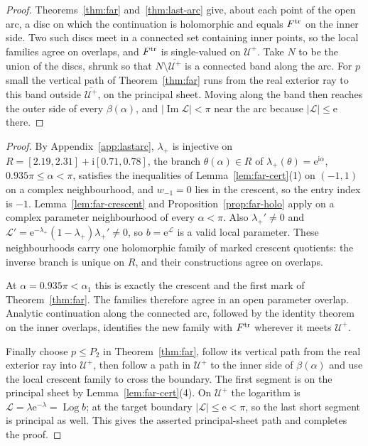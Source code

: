 \documentclass[11pt]{amsart}
\theoremstyle{definition}
\newcommand{\eee}{\mathrm{e}}
\newcommand{\ii}{\mathrm{i}}
\begin{document}
\begin{proof}
Theorems~\ref{thm:far} and~\ref{thm:last-arc} give, about each point of the open
arc, a disc on which the continuation is holomorphic and equals $F^{\rm tr}$ on the
inner side.  Two such discs meet in a connected set containing inner points, so
the local families agree on overlaps, and $F^{\rm tr}$ is single-valued on $\mathcal U^+$.
Take $N$ to be the union of the discs, shrunk so that $N\setminus\overline{\mathcal U^+}$ is a connected
band along the arc.  For $p$ small the vertical path of Theorem~\ref{thm:far}
runs from the real exterior ray to this band outside $\overline{\mathcal U^+}$, on the principal
sheet.  Moving along the band then reaches the outer side of every $\beta(\alpha)$,
and $|\operatorname{Im}\mathcal L|<\pi$ near the arc because $|\mathcal L|\le\eee$ there.
\end{proof}

\begin{proof}
By Appendix~\ref{app:lastarc}, $\lambda_+$ is injective on $R=[2.19,2.31]+\ii[0.71,0.78]$, the
branch $\theta(\alpha)\in R$ of $\lambda_+(\theta)=\eee^{\ii\alpha}$, $0.935\pi\le\alpha<\pi$, satisfies the inequalities of
Lemma~\ref{lem:far-cert}(1) on $(-1,1)$ on a complex neighbourhood, and $w_{-1}=0$ lies in the
crescent, so the entry index is $-1$.  Lemma~\ref{lem:far-crescent} and
Proposition~\ref{prop:far-holo} apply on a complex parameter neighbourhood
of every $\alpha<\pi$.  Also $\lambda_+'\ne0$ and
$\mathcal L'=\eee^{-\lambda_+}(1-\lambda_+)\lambda_+'\ne0$, so $b=\eee^{\mathcal L}$ is a valid
local parameter.  These neighbourhoods carry one holomorphic family of
marked crescent quotients: the inverse branch is unique on $R$, and their
constructions agree on overlaps.

At $\alpha=0.935\pi<\alpha_1$ this is exactly the crescent and the first
mark of Theorem~\ref{thm:far}.  The families therefore agree in an open
parameter overlap.  Analytic continuation along the connected arc, followed
by the identity theorem on the inner overlaps, identifies the new family
with $F^{\rm tr}$ wherever it meets $\mathcal U^+$.

Finally choose $p\le P_2$ in Theorem~\ref{thm:far}, follow its vertical path
from the real exterior ray into $\mathcal U^+$, then follow a path in
$\mathcal U^+$ to the inner side of $\beta(\alpha)$ and use the local
crescent family to cross the boundary.  The first segment is on the principal
sheet by Lemma~\ref{lem:far-cert}(4).  On $\mathcal U^+$ the logarithm is
$\mathcal L=\lambda\eee^{-\lambda}=\operatorname{Log}b$; at the target boundary
$|\mathcal L|\le\eee<\pi$, so the last short segment is principal as well.
This gives the asserted principal-sheet path and completes the proof.
\end{proof}
\end{document}
